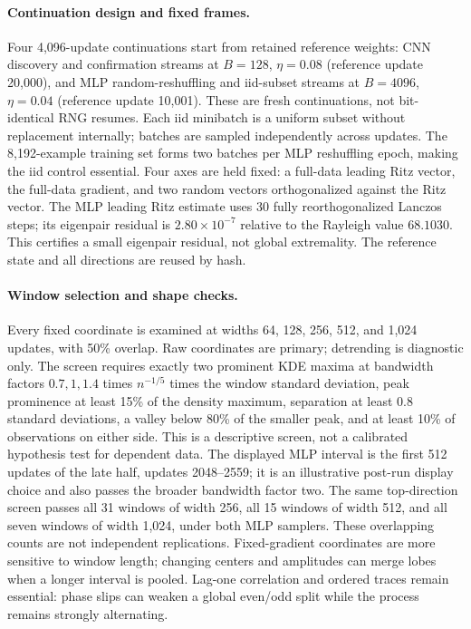\paragraph{Continuation design and fixed frames.}
Four 4,096-update continuations start from retained reference weights:
CNN discovery and confirmation streams at $B=128$, $\eta=0.08$ (reference update 20,000),
and MLP random-reshuffling and iid-subset streams at $B=4096$, $\eta=0.04$
(reference update 10,001). These are fresh continuations, not bit-identical RNG resumes.
Each iid minibatch is a uniform subset without replacement internally; batches are sampled independently across updates.
The 8,192-example training set forms two batches per MLP reshuffling epoch, making the iid control essential.
Four axes are held fixed: a full-data leading Ritz vector, the full-data gradient,
and two random vectors orthogonalized against the Ritz vector.
The MLP leading Ritz estimate uses 30 fully reorthogonalized Lanczos steps;
its eigenpair residual is $2.80\times10^{-7}$ relative to the Rayleigh value $68.1030$.
This certifies a small eigenpair residual, not global extremality.
The reference state and all directions are reused by hash.

\paragraph{Window selection and shape checks.}
Every fixed coordinate is examined at widths 64, 128, 256, 512, and 1,024 updates,
with 50\% overlap. Raw coordinates are primary; detrending is diagnostic only.
The screen requires exactly two prominent KDE maxima at bandwidth factors
$0.7,1,1.4$ times $n^{-1/5}$ times the window standard deviation,
peak prominence at least 15\% of the density maximum, separation at least 0.8 standard deviations,
a valley below 80\% of the smaller peak, and at least 10\% of observations on either side.
This is a descriptive screen, not a calibrated hypothesis test for dependent data.
The displayed MLP interval is the first 512 updates of the late half, updates 2048--2559;
it is an illustrative post-run display choice and also passes the broader bandwidth factor two.
The same top-direction screen passes all 31 windows of width 256, all 15 windows of width 512,
and all seven windows of width 1,024, under both MLP samplers.
These overlapping counts are not independent replications.
Fixed-gradient coordinates are more sensitive to window length; changing centers and amplitudes can
merge lobes when a longer interval is pooled.
Lag-one correlation and ordered traces remain essential: phase slips can weaken a global even/odd split
while the process remains strongly alternating.

